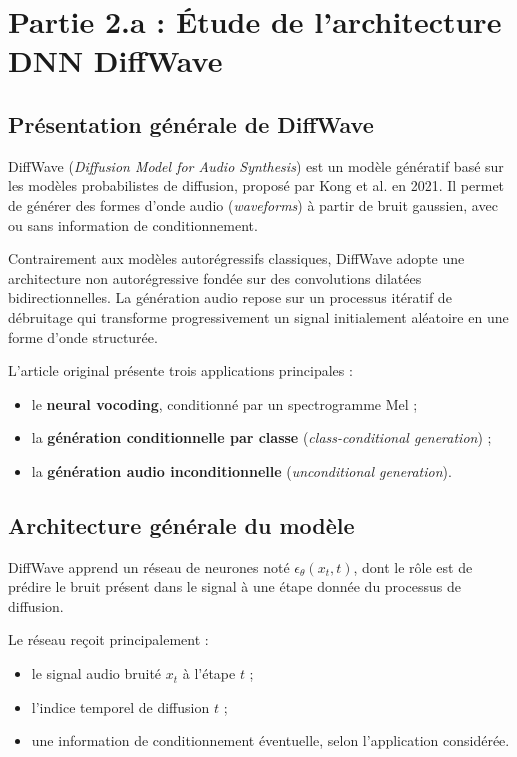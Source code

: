 
\section{Partie 2.a : Étude de l'architecture DNN DiffWave}
\label{sec:diffwave}

\subsection{Présentation générale de DiffWave}

DiffWave (\textit{Diffusion Model for Audio Synthesis}) est un modèle
génératif basé sur les modèles probabilistes de diffusion, proposé par
Kong et al. en 2021. Il permet de générer des formes d'onde audio
(\textit{waveforms}) à partir de bruit gaussien, avec ou sans information
de conditionnement.

Contrairement aux modèles autorégressifs classiques, DiffWave adopte
une architecture non autorégressive fondée sur des convolutions
dilatées bidirectionnelles. La génération audio repose sur un processus
itératif de débruitage qui transforme progressivement un signal
initialement aléatoire en une forme d'onde structurée.

L'article original présente trois applications principales :
\begin{itemize}
    \item le \textbf{neural vocoding}, conditionné par un
    spectrogramme Mel ;
    \item la \textbf{génération conditionnelle par classe}
    (\textit{class-conditional generation}) ;
    \item la \textbf{génération audio inconditionnelle}
    (\textit{unconditional generation}).
\end{itemize}

\subsection{Architecture générale du modèle}

DiffWave apprend un réseau de neurones noté
$\epsilon_\theta(x_t,t)$, dont le rôle est de prédire le bruit
présent dans le signal à une étape donnée du processus de diffusion.

Le réseau reçoit principalement :
\begin{itemize}
    \item le signal audio bruité $x_t$ à l'étape $t$ ;
    \item l'indice temporel de diffusion $t$ ;
    \item une information de conditionnement éventuelle, selon
    l'application considérée.
\end{itemize}

